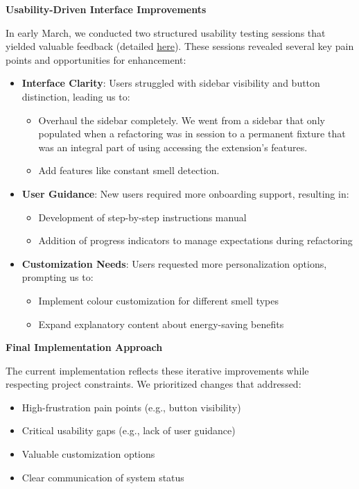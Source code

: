\documentclass{article}
\begin{document}
\noindent \textbf{Usability-Driven Interface Improvements}

\noindent
In early March, we conducted two structured usability testing sessions that yielded valuable feedback (detailed \href{https://github.com/ssm-lab/capstone--source-code-optimizer/blob/main/docs/Extras/UsabilityTesting/UsabilityTestingReport.pdf}{here}). These sessions revealed several key pain points and opportunities for enhancement:

\begin{itemize}
    \item \textbf{Interface Clarity}: Users struggled with sidebar visibility and button distinction, leading us to:
    \begin{itemize}
        \item Overhaul the sidebar completely. We went from a sidebar that only populated when a refactoring was in session to a permanent fixture that was an integral part of using accessing the extension's features.
        \item Add features like constant smell detection.
    \end{itemize}
    
    \item \textbf{User Guidance}: New users required more onboarding support, resulting in:
    \begin{itemize}
        \item Development of step-by-step instructions manual
        \item Addition of progress indicators to manage expectations during refactoring
    \end{itemize}
    
    \item \textbf{Customization Needs}: Users requested more personalization options, prompting us to:
    \begin{itemize}
        \item Implement colour customization for different smell types
        \item Expand explanatory content about energy-saving benefits
    \end{itemize}
\end{itemize}


\noindent \textbf{Final Implementation Approach}

\noindent
The current implementation reflects these iterative improvements while respecting project constraints. We prioritized changes that addressed:
\begin{itemize}
    \item High-frustration pain points (e.g., button visibility)
    \item Critical usability gaps (e.g., lack of user guidance)
    \item Valuable customization options
    \item Clear communication of system status
\end{itemize}
\end{document}
